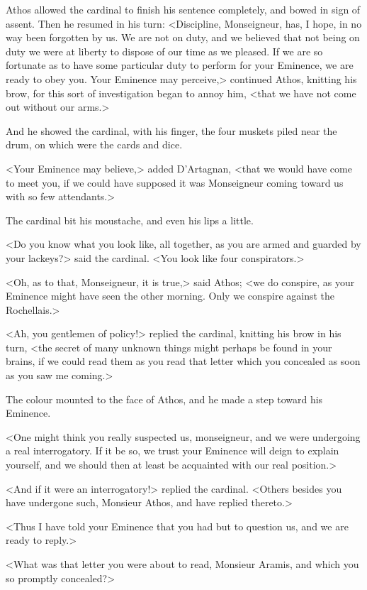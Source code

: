 Athos allowed the cardinal to finish his sentence completely, and bowed in sign of assent. Then he resumed in his turn: <Discipline, Monseigneur, has, I hope, in no way been forgotten by us. We are not on duty, and we believed that not being on duty we were at liberty to dispose of our time as we pleased. If we are so fortunate as to have some particular duty to perform for your Eminence, we are ready to obey you. Your Eminence may perceive,> continued Athos, knitting his brow, for this sort of investigation began to annoy him, <that we have not come out without our arms.> 

And he showed the cardinal, with his finger, the four muskets piled near the drum, on which were the cards and dice. 

<Your Eminence may believe,> added D'Artagnan, <that we would have come to meet you, if we could have supposed it was Monseigneur coming toward us with so few attendants.> 

The cardinal bit his moustache, and even his lips a little. 

<Do you know what you look like, all together, as you are armed and guarded by your lackeys?> said the cardinal. <You look like four conspirators.> 

<Oh, as to that, Monseigneur, it is true,> said Athos; <we do conspire, as your Eminence might have seen the other morning. Only we conspire against the Rochellais.> 

<Ah, you gentlemen of policy!> replied the cardinal, knitting his brow in his turn, <the secret of many unknown things might perhaps be found in your brains, if we could read them as you read that letter which you concealed as soon as you saw me coming.> 

The colour mounted to the face of Athos, and he made a step toward his Eminence. 

<One might think you really suspected us, monseigneur, and we were undergoing a real interrogatory. If it be so, we trust your Eminence will deign to explain yourself, and we should then at least be acquainted with our real position.> 

<And if it were an interrogatory!> replied the cardinal. <Others besides you have undergone such, Monsieur Athos, and have replied thereto.> 

<Thus I have told your Eminence that you had but to question us, and we are ready to reply.> 

<What was that letter you were about to read, Monsieur Aramis, and which you so promptly concealed?> 

